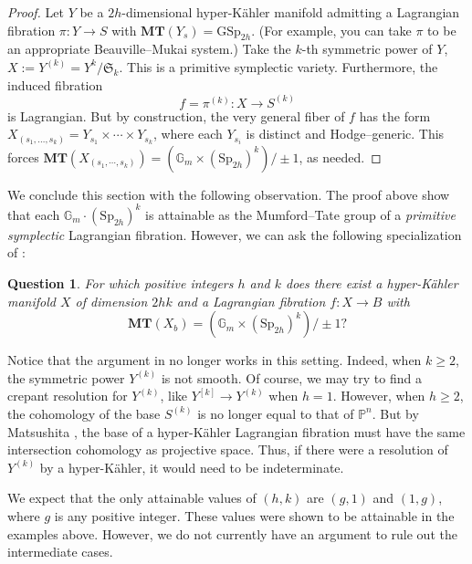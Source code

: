 \documentclass[12pt]{amsart}
\newcommand{\bbP}{\mathbb{P}}
\newcommand{\Sp}{\mathrm{Sp}}
\newtheorem{question}[theorem]{Question}
\theoremstyle{definition}
\numberwithin{equation}{section}
\begin{document}
\begin{proof}
Let \(Y\) be a \(2h\)-dimensional hyper-K\"ahler manifold admitting a Lagrangian fibration 
\(\pi: Y \to S\) with \(\mathbf{MT}(Y_s) = \mathrm{GSp}_{2h}\). (For example, you can 
take \(\pi\) to be an appropriate Beauville--Mukai system.) Take the \(k\)-th symmetric 
power of \(Y\), \(X := Y^{(k)} = Y^k/\mathfrak{S}_k\). This is a primitive symplectic 
variety. Furthermore, the induced fibration 
\begin{equation*}
    f = \pi^{(k)}: X \to S^{(k)}
\end{equation*}
is Lagrangian. But by construction, the very general fiber of \(f\) has the form 
\(X_{(s_1, \dots, s_k)} = Y_{s_1} \times \cdots \times Y_{s_k}\), where each 
\(Y_{s_i}\) is distinct and Hodge--generic. This forces 
\(\mathbf{MT}(X_{(s_1, \cdots, s_k)}) = (\mathbb{G}_m \times (\mathrm{Sp}_{2h})^k) / \pm 1\), 
as needed.
\end{proof}

We conclude this section with the following observation.
The proof above show that each \(\mathbb{G}_m \cdot (\Sp_{2h})^k\) is attainable as 
the Mumford--Tate group of a {\it primitive symplectic} Lagrangian fibration. However, 
we can ask the following specialization of : 
\begin{question}
    For which positive integers \(h\) and \(k\) does there exist a hyper-K\"ahler 
    manifold \(X\) of dimension \(2hk\) and a Lagrangian fibration \(f: X \to B\) with 
    \[\mathbf{MT}(X_b) = (\mathbb{G}_m \times (\mathrm{Sp}_{2h})^k) / \pm 1? \]
\end{question}

Notice that the argument in  no longer works in this setting. 
Indeed, when \(k \geq 2\), the symmetric power \(Y^{(k)}\) is not smooth.
Of course, we may try to find a crepant resolution for \(Y^{(k)}\), like
\(Y^{[k]} \to Y^{(k)}\) when \(h = 1\). However, when \(h \geq 2\), 
the cohomology of the base \(S^{(k)}\) is no longer equal to that of \(\bbP^n\). 
But by Matsushita \cite{matsushita16}, the base of a hyper-K\"ahler Lagrangian fibration 
must have the same intersection cohomology as projective space. Thus, 
if there were a resolution of \(Y^{(k)}\) by a hyper-K\"ahler, it would need to be 
indeterminate.

We expect that the only attainable values of \((h, k)\) are \((g, 1)\) and \((1, g)\), 
where \(g\) is any positive integer. These values were shown to be attainable in the 
examples above. However, we do not currently have an argument to rule out the 
intermediate cases.
\end{document}
